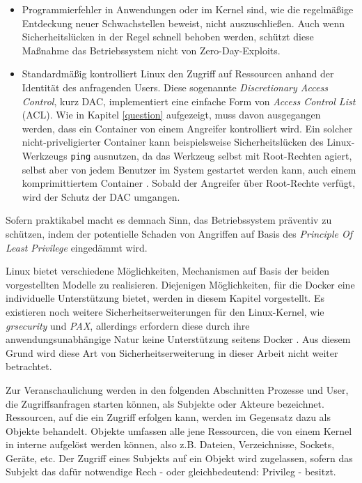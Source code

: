 \documentclass[../main.tex]{subfiles}
\begin{document}
		\begin{itemize}
			\item	Programmierfehler in Anwendungen oder im Kernel sind, wie die regelmäßige Entdeckung neuer Schwachstellen beweist, nicht auszuschließen. Auch wenn Sicherheitslücken in der Regel schnell behoben werden, schützt diese Maßnahme das Betriebssystem nicht von Zero-Day-Exploits.
			\item	Standardmäßig kontrolliert Linux den Zugriff auf Ressourcen anhand der Identität des anfragenden Users. Diese sogenannte \emph{Discretionary Access Control}, kurz \acrshort{DAC}, implementiert eine einfache Form von \emph{Access Control List} (\acrshort{ACL}). Wie in Kapitel \ref{question} aufgezeigt, muss davon ausgegangen werden, dass ein Container von einem Angreifer kontrolliert wird. Ein solcher nicht-priveligierter Container kann beispielsweise Sicherheitslücken des Linux-Werkzeugs \texttt{ping} ausnutzen, da das Werkzeug selbst mit Root-Rechten agiert, selbst aber von jedem Benutzer im System gestartet werden kann, auch einem komprimittiertem Container \cite[S.26]{SELinuxApparmor}. Sobald der Angreifer über Root-Rechte verfügt, wird der Schutz der \acrshort{DAC} umgangen.
		\end{itemize}

		Sofern praktikabel macht es demnach Sinn, das Betriebssystem präventiv zu schützen, indem der potentielle Schaden von Angriffen auf Basis des \emph{Principle Of Least Privilege} eingedämmt wird.

		Linux bietet verschiedene Möglichkeiten, Mechanismen auf Basis der beiden vorgestellten Modelle zu realisieren. Diejenigen Möglichkeiten, für die Docker eine individuelle Unterstützung bietet, werden in diesem Kapitel vorgestellt. Es existieren noch weitere Sicherheitserweiterungen für den Linux-Kernel, wie \emph{grsecurity} und \emph{PAX}, allerdings erfordern diese durch ihre anwendungsunabhängige Natur keine Unterstützung seitens Docker \cite{dockerSecurity}. Aus diesem Grund wird diese Art von Sicherheitserweiterung in dieser Arbeit nicht weiter betrachtet.

		Zur Veranschaulichung werden in den folgenden Abschnitten Prozesse und User, die Zugriffsanfragen starten können, als Subjekte oder Akteure bezeichnet. Ressourcen, auf die ein Zugriff erfolgen kann, werden im Gegensatz dazu als Objekte behandelt. Objekte umfassen alle jene Ressourcen, die von einem Kernel in interne  aufgelöst werden können, also z.B. Dateien, Verzeichnisse, Sockets, Geräte, etc. Der Zugriff eines Subjekts auf ein Objekt wird zugelassen, sofern das Subjekt das dafür notwendige Rech - oder gleichbedeutend: Privileg - besitzt.
\end{document}
